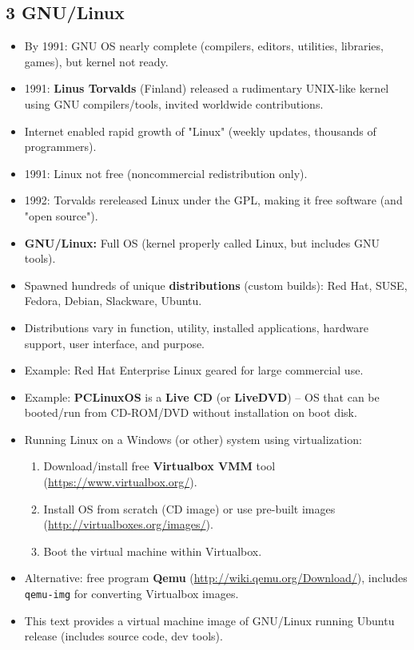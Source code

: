 \documentclass{article}
\begin{document}
\subsection*{3 GNU/Linux}
\begin{itemize}
    \item By 1991: GNU OS nearly complete (compilers, editors, utilities, libraries, games), but kernel not ready.
    \item 1991: \textbf{Linus Torvalds} (Finland) released a rudimentary UNIX-like kernel using GNU compilers/tools, invited worldwide contributions.
    \item Internet enabled rapid growth of "Linux" (weekly updates, thousands of programmers).
    \item 1991: Linux not free (noncommercial redistribution only).
    \item 1992: Torvalds rereleased Linux under the GPL, making it free software (and "open source").
    \item \textbf{GNU/Linux:} Full OS (kernel properly called Linux, but includes GNU tools).
    \item Spawned hundreds of unique \textbf{distributions} (custom builds): Red Hat, SUSE, Fedora, Debian, Slackware, Ubuntu.
    \item Distributions vary in function, utility, installed applications, hardware support, user interface, and purpose.
    \item Example: Red Hat Enterprise Linux geared for large commercial use.
    \item Example: \textbf{PCLinuxOS} is a \textbf{Live CD} (or \textbf{LiveDVD}) -- OS that can be booted/run from CD-ROM/DVD without installation on boot disk.
    \item Running Linux on a Windows (or other) system using virtualization:
    \begin{enumerate}
        \item Download/install free \textbf{Virtualbox VMM} tool (\url{https://www.virtualbox.org/}).
        \item Install OS from scratch (CD image) or use pre-built images (\url{http://virtualboxes.org/images/}).
        \item Boot the virtual machine within Virtualbox.
    \end{enumerate}
    \item Alternative: free program \textbf{Qemu} (\url{http://wiki.qemu.org/Download/}), includes \texttt{qemu-img} for converting Virtualbox images.
    \item This text provides a virtual machine image of GNU/Linux running Ubuntu release (includes source code, dev tools).
\end{itemize}
\end{document}
